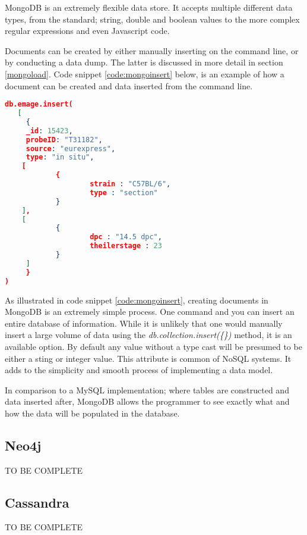 MongoDB is an extremely flexible data store. It accepts multiple different data types, from the standard; string, double and boolean values to the more complex regular expressions and even Javascript code.

Documents can be created by either manually inserting on the command line, or by conducting a data dump. The latter is discussed in more detail in section \ref{mongoload}. Code snippet \ref{code:mongoinsert} below, is an example of how a document can be created and data inserted from the command line.

\begin{lstlisting}[language=json,caption=Inserting data into a mongo document, label=code:mongoinsert]
db.emage.insert(
   [
     { 
     _id: 15423,
     probeID: "T31182",
     source: "eurexpress",
     type: "in situ",
    [
    		{
     				strain : "C57BL/6",
     				type : "section"
     		}
    ],
    [
    		{
     				dpc : "14.5 dpc",
     				theilerstage : 23
     		}
     ]
     }
)
\end{lstlisting}
\newpage

As illustrated in code snippet \ref{code:mongoinsert}, creating documents in MongoDB is an extremely simple process. One command and you can insert an entire database of information. While it is unlikely that one would manually insert a large volume of data using the \textit{db.collection.insert(\{\})} method, it is an available option. By default any value without a type cast will be presumed to be either a sting or integer value. This attribute is common of NoSQL systems. It adds to the simplicity and smooth process of implementing a data model.

In comparison to a MySQL implementation; where tables are constructed and data inserted after, MongoDB allows the programmer to see exactly what and how the data will be populated in the database.


\subsection*{Neo4j}
TO BE COMPLETE

\subsection*{Cassandra}
TO BE COMPLETE




